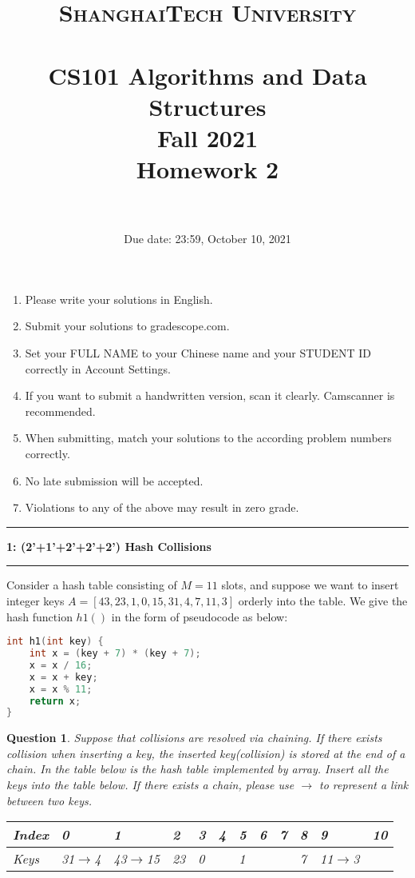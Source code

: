 \documentclass{article}
\title{
	\normalfont \normalsize
	\textsc{ShanghaiTech University} \\ [25pt]
	\horrule{0.5pt} \\[0.4cm] %
	\huge CS101 Algorithms and Data Structures\\ %
	\LARGE Fall 2021\\
	\LARGE Homework 2\\
	\horrule{2pt} \\[0.5cm] %
}
\author{}
\date{Due date: 23:59, October 10, 2021}
\newcommand\question[2]{\vspace{.25in}\hrule\textbf{#1: #2}\vspace{.5em}\hrule\vspace{.10in}}
\newtheorem{Q}{Question}
\begin{document}
\maketitle
\thispagestyle{firstpage}
\vspace{3ex}

\begin{enumerate}
	\item Please write your solutions in English.

	\item Submit your solutions to gradescope.com.

	\item Set your FULL NAME to your Chinese name and your STUDENT ID correctly in Account Settings.

	\item If you want to submit a handwritten version, scan it clearly. Camscanner is recommended.

	\item When submitting, match your solutions to the according problem numbers correctly.

	\item No late submission will be accepted.

	\item Violations to any of the above may result in zero grade.
\end{enumerate}
\newpage

\question{1}{(2'+1'+2'+2'+2') Hash Collisions}
Consider a hash table consisting of $M= 11$ slots, and suppose we want to insert integer keys $A = [43, 23, 1 , 0,15 ,31 ,4 ,7 ,11 ,3]$ orderly into the table. We give the hash function $h1()$ in the form of pseudocode as below:

\hrulefill
\rm{
	\begin{lstlisting}[language=C++]
int h1(int key) {
	int x = (key + 7) * (key + 7);
	x = x / 16;
	x = x + key;
	x = x % 11;
	return x;
}
\end{lstlisting}
}
\hrulefill

\begin{Q} Suppose that collisions are resolved via chaining. If there exists collision when inserting a key, the inserted key(collision) is stored at the end of a chain. In the table below is the hash table implemented by array. Insert all the keys into the table below. If there exists a chain, please use $\rightarrow$
	to represent a link between two keys.
	\begin{table}[ht]
		\begin{tabular}{|l|p{1cm}|p{1cm}|p{1cm}|p{1cm}|p{1cm}|p{1cm}|p{1cm}|p{1cm}|p{1cm}|p{1cm}|p{1cm}|}
			\hline
			Index & 0                & 1                 & 2  & 3 & 4 & 5 & 6 & 7 & 8 & 9                & 10 \\ \hline
			Keys  & 31$\rightarrow$4 & 43$\rightarrow$15 & 23 & 0 &   & 1 &   &   & 7 & 11$\rightarrow$3 &    \\ \hline
		\end{tabular}
	\end{table}
\end{Q}
\end{document}
